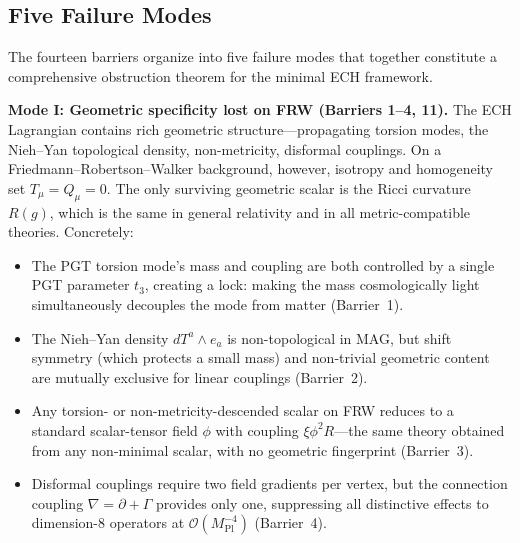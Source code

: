 \subsection{Five Failure Modes}
\label{sec:failure_modes}

The fourteen barriers organize into five failure modes that together constitute
a comprehensive obstruction theorem for the minimal ECH framework.

\medskip
\noindent\textbf{Mode I: Geometric specificity lost on FRW
  (Barriers 1--4, 11).}
The ECH Lagrangian contains rich geometric structure---propagating torsion
modes, the Nieh--Yan topological density, non-metricity, disformal couplings.
On a Friedmann--Robertson--Walker background, however, isotropy and homogeneity
set $T_\mu = Q_\mu = 0$.  The only surviving geometric scalar is the Ricci
curvature $R(g)$, which is the same in general relativity and in all
metric-compatible theories.  Concretely:
\begin{itemize}
\item The PGT torsion mode's mass and coupling are both controlled by
  a single PGT parameter $t_3$, creating a lock: making the mass cosmologically
  light simultaneously decouples the mode from matter (Barrier~1).
\item The Nieh--Yan density $dT^a \wedge e_a$ is non-topological in MAG, but
  shift symmetry (which protects a small mass) and non-trivial geometric
  content are mutually exclusive for linear couplings (Barrier~2).
\item Any torsion- or non-metricity-descended scalar on FRW reduces to a
  standard scalar-tensor field $\phi$ with coupling $\xi\phi^2 R$---the same
  theory obtained from any non-minimal scalar, with no geometric fingerprint
  (Barrier~3).
\item Disformal couplings require two field gradients per vertex, but the
  connection coupling $\nabla = \partial + \Gamma$ provides only one,
  suppressing all distinctive effects to dimension-8 operators at
  $\mathcal{O}(M_\mathrm{Pl}^{-4})$ (Barrier~4).
\end{itemize}


